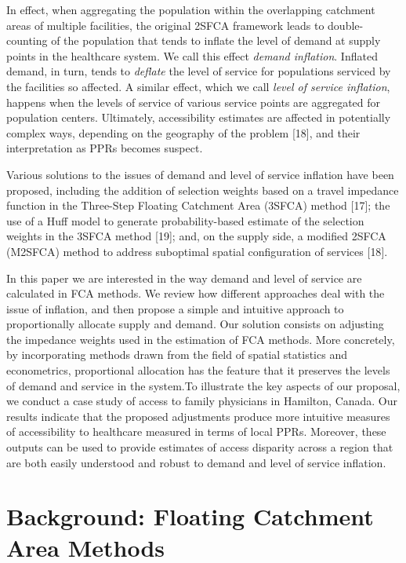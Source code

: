 \documentclass[10pt,letterpaper]{article}
\begin{document}
In effect, when aggregating the population within the overlapping
catchment areas of multiple facilities, the original 2SFCA framework
leads to double-counting of the population that tends to inflate the
level of demand at supply points in the healthcare system. We call this
effect \emph{demand inflation}. Inflated demand, in turn, tends to
\emph{deflate} the level of service for populations serviced by the
facilities so affected. A similar effect, which we call \emph{level of
service inflation}, happens when the levels of service of various
service points are aggregated for population centers. Ultimately,
accessibility estimates are affected in potentially complex ways,
depending on the geography of the problem {[}18{]}, and their
interpretation as PPRs becomes suspect.

Various solutions to the issues of demand and level of service inflation
have been proposed, including the addition of selection weights based on
a travel impedance function in the Three-Step Floating Catchment Area
(3SFCA) method {[}17{]}; the use of a Huff model to generate
probability-based estimate of the selection weights in the 3SFCA method
{[}19{]}; and, on the supply side, a modified 2SFCA (M2SFCA) method to
address suboptimal spatial configuration of services {[}18{]}.

In this paper we are interested in the way demand and level of service
are calculated in FCA methods. We review how different approaches deal
with the issue of inflation, and then propose a simple and intuitive
approach to proportionally allocate supply and demand. Our solution
consists on adjusting the impedance weights used in the estimation of
FCA methods. More concretely, by incorporating methods drawn from the
field of spatial statistics and econometrics, proportional allocation
has the feature that it preserves the levels of demand and service in
the system.To illustrate the key aspects of our proposal, we conduct a
case study of access to family physicians in Hamilton, Canada. Our
results indicate that the proposed adjustments produce more intuitive
measures of accessibility to healthcare measured in terms of local PPRs.
Moreover, these outputs can be used to provide estimates of access
disparity across a region that are both easily understood and robust to
demand and level of service inflation.

\section{Background: Floating Catchment Area
Methods}\label{background-floating-catchment-area-methods}
\end{document}
